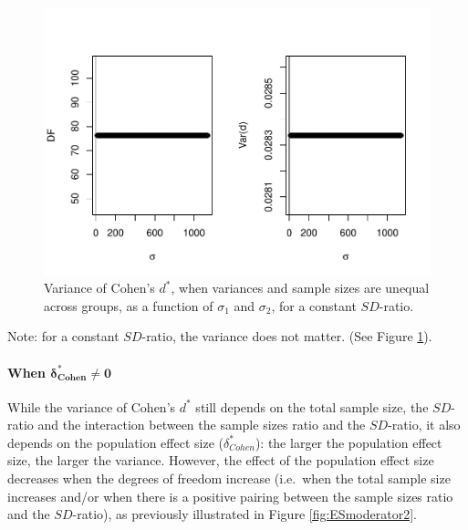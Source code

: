 \documentclass[
  english,
  man,mask]{apa6}
\let\oldparagraph\paragraph
\renewcommand{\paragraph}[1]{\oldparagraph{#1}\mbox{}}
\begin{document}
\begin{figure}
\centering
\includegraphics{Theoretical-Variance-of-all-estimators-as-a-function-of-population-parameters_files/figure-latex/varcohendprimehetunbalvariance2-1.pdf}
\caption{\label{fig:varcohendprimehetunbalvariance2}Variance of Cohen's \(d^*\), when variances and sample sizes are unequal across groups, as a function of \(\sigma_1\) and \(\sigma_2\), for a constant \(SD\)-ratio.}
\end{figure}

Note: for a constant \(SD\)-ratio, the variance does not matter. (See Figure \ref{fig:varcohendprimehetunbalvariance2}).

\hypertarget{when-bmdelta_cohen-neq-0-2}{%
\paragraph{\texorpdfstring{When \(\bm{\delta^*_{Cohen} \neq 0}\)}{When \textbackslash bm\{\textbackslash delta\^{}*\_\{Cohen\} \textbackslash neq 0\}}}\label{when-bmdelta_cohen-neq-0-2}}

While the variance of Cohen's \(d^*\) still depends on the total sample size, the \(SD\)-ratio and the interaction between the sample sizes ratio and the \(SD\)-ratio, it also depends on the population effect size (\(\delta^*_{Cohen}\)): the larger the population effect size, the larger the variance. However, the effect of the population effect size decreases when the degrees of freedom increase (i.e.~when the total sample size increases and/or when there is a positive pairing between the sample sizes ratio and the \(SD\)-ratio), as previously illustrated in Figure \ref{fig:ESmoderator2}.
\end{document}
